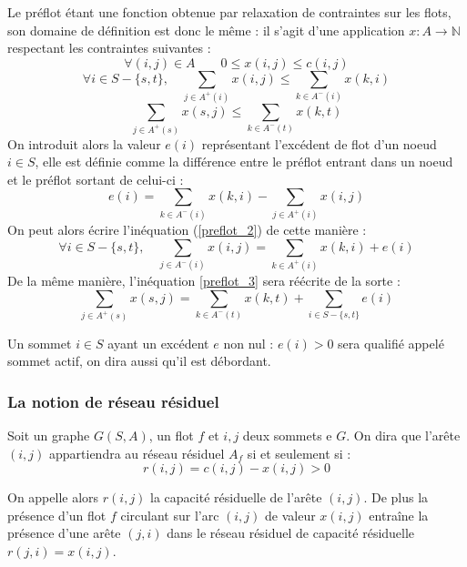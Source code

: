 Le préflot étant une fonction obtenue par relaxation de contraintes sur les flots, son
domaine de définition est donc le même : il s'agit d'une application $x : A \rightarrow \mathbb{N}$
respectant les contraintes suivantes :
		\begin{equation}
			\label{preflot_1}
			\forall (i,j) \in A \qquad 0 \leq x(i,j) \leq c(i,j)
		\end{equation}
		\begin{equation} 
			\label{preflot_2}
			\forall i \in S - \{s,t\},\quad \sum_{j \in A^+(i)} x(i,j) \leq \sum_{k \in A^-(i)} x(k,i)
		\end{equation}
		\begin{equation}
			\label{preflot_3}
			\sum_{j \in A^+(s)} x(s,j) \leq \sum_{k \in A^-(t)} x(k, t)
		\end{equation}
On introduit alors la valeur $e(i)$ représentant l'excédent de flot d'un noeud $i \in S$, elle est
définie comme la différence entre le préflot entrant dans un noeud et le préflot sortant de celui-ci
: \begin{equation}
	e(i) = \sum_{k \in A^-(i)} x(k,i) - \sum_{j \in A^+(i)} x(i,j)
\end{equation}
 On peut alors écrire l'inéquation (\ref{preflot_2}) de cette manière :
\begin{equation} 
\forall i \in S - \{s,t\},\quad \sum_{j \in A^-(i)} x(i,j) = \sum_{k \in A^+(i)} x(k,i) + e(i)
\end{equation}
De la même manière, l'inéquation \ref{preflot_3} sera réécrite de la sorte :
\begin{equation}
\sum_{j \in A^+(s)} x(s,j) = \sum_{k \in A^-(t)} x(k, t) + \sum_{i \in S-\{s,t\}} e(i)
\end{equation}

Un sommet $i \in S$ ayant un excédent $e$ non nul : $e(i) > 0$ sera qualifié appelé sommet actif, on
dira aussi qu'il est débordant.

\subsubsection{La notion de réseau résiduel}

Soit un graphe $G(S, A)$, un flot $f$ et $i,j$ deux sommets e $G$. On dira que l'arête
$(i,j)$ appartiendra au réseau résiduel $A_f$ si et seulement si :
\begin{equation}
	 r(i,j) = c(i,j) - x(i,j) > 0
\end{equation}

On appelle alors $r(i,j)$ la capacité résiduelle de l'arête $(i,j)$. De plus la présence d'un flot
$f$ circulant sur l'arc $(i,j)$ de valeur $x(i,j)$ entraîne la présence d'une arête $(j,i)$
dans le réseau résiduel de capacité résiduelle $r(j,i) = x(i,j)$. 

